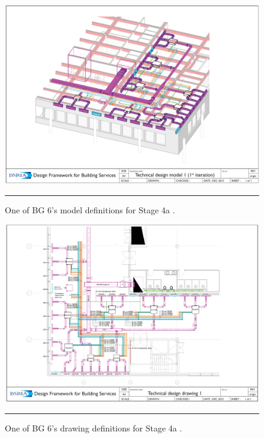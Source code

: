 \begin{figure}[htbp]
	\centering
	\includegraphics[height=.4\textheight]{figures/BG6_MD4a.png}
	\rule{.9\textwidth}{0.5pt} %
	\caption[One of BG 6's model definitions for Stage 4a.]{One of BG 6's model definitions for Stage 4a \citep{BG62014}.}
	\label{fig_BG6_MD4a}
\end{figure}


\begin{figure}[htbp]
	\centering
	\includegraphics[height=.4\textheight]{figures/BG6_DD4a.png}
	\rule{.9\textwidth}{0.5pt} %
	\caption[One of BG 6's drawing definitions for Stage 4a.]{One of BG 6's drawing definitions for Stage 4a \citep{BG62014}.}
	\label{fig_BG6_DD4a}
\end{figure}






